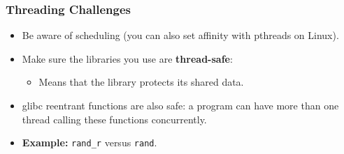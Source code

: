 \begin{frame}
  \frametitle{Threading Challenges}

  \begin{itemize}
    \item Be aware of scheduling (you can also set affinity with pthreads on
      Linux).
    \vfill
    \item Make sure the libraries you use are {\bf thread-safe}:
      \begin{itemize}
        \item Means that the library protects its shared data.
      \end{itemize}
    \vfill
    \item glibc reentrant functions are also safe: a program can have more than one
      thread calling these functions concurrently.
    \vfill
    \item {\bf Example:} {\tt rand\_r} versus
      {\tt rand}.
  \end{itemize}

\end{frame}






